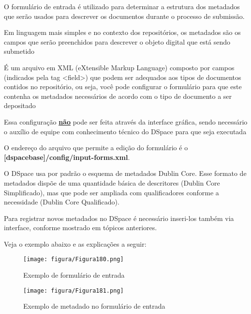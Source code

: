 \documentclass[12pt,hidelinks]{article}
\begin{document}
    O formulário de entrada é utilizado para determinar a estrutura dos metadados que serão usados para descrever os documentos durante o processo de submissão. 
    
    \singlespacing
    
    Em linguagem mais simples e no contexto dos repositórios, os metadados são os campos que serão preenchidos para descrever o objeto digital que está sendo submetido
    
    \singlespacing
    
    É um arquivo em XML (eXtensible Markup Language) composto por campos (indicados pela tag <\textcolor{applegreen}{field}>) que podem ser adequados aos tipos de documentos contidos no repositório, ou seja, você pode configurar o formulário para que este contenha os metadados necessários de acordo com o tipo de documento a ser depositado
    
    \singlespacing
    
    Essa configuração \underline{\textbf{não}} pode ser feita através da interface gráfica, sendo necessário o auxílio de equipe com conhecimento técnico do DSpace para que seja executada
    
    \singlespacing
    
    O endereço do arquivo que permite a edição do formulário é o \textbf{[dspacebase]/config/input-forms.xml}.
    
    \singlespacing
    
    O DSpace usa por padrão o esquema de metadados Dublin Core. Esse formato de metadados dispõe de uma quantidade básica de descritores (Dublin Core Simplificado), mas que pode ser ampliada com qualificadores conforme a necessidade (Dublin Core Qualificado).
    
    \singlespacing
    
    Para registrar novos metadados no DSpace é necessário inseri-los também via interface, conforme mostrado em tópicos anteriores.
    
    Veja o exemplo abaixo e as explicações a seguir:
    
    \begin{figure}[!htp]
                \centering
                \texttt{[image: figura/Figura180.png]}
                \caption{Exemplo de formulário de entrada}
            \label{Rotulo}
        \end{figure}
        
\newpage

    \begin{figure}[!htp]
                \centering
                \texttt{[image: figura/Figura181.png]}
                \caption{Exemplo de metadado no formulário de entrada}
            \label{Rotulo}
        \end{figure}
    
\end{document}
